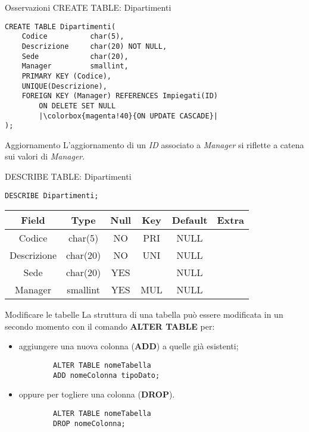 %
\begin{frame}[fragile]{Osservazioni CREATE TABLE: Dipartimenti}
\vspace{-.6cm}
\begin{lstlisting}
CREATE TABLE Dipartimenti(
    Codice          char(5),
    Descrizione     char(20) NOT NULL,
    Sede            char(20),
    Manager         smallint,
    PRIMARY KEY (Codice),
    UNIQUE(Descrizione),
    FOREIGN KEY (Manager) REFERENCES Impiegati(ID)
        ON DELETE SET NULL
        |\colorbox{magenta!40}{ON UPDATE CASCADE}|
);    
\end{lstlisting}
\begin{block}{Aggiornamento}
    L'aggiornamento di un \textit{ID} associato a \textit{Manager} si riflette a catena sui valori di \textit{Manager}.
\end{block}
\end{frame}
%
\begin{frame}[fragile]{DESCRIBE TABLE: Dipartimenti}
\begin{lstlisting}
DESCRIBE Dipartimenti;
\end{lstlisting}
\begin{tabular}{|c|c|c|c|c|c|}
    \hline
    \rowcolor{cyan!30} Field & Type & Null & Key & Default & Extra \\
    \hline
    Codice & char(5) & NO & PRI & NULL & \\ \hline
    Descrizione & char(20) & NO & UNI & NULL & \\ \hline
    Sede & char(20) & YES & & NULL & \\ \hline
    Manager & smallint & YES & MUL & NULL & \\ \hline
\end{tabular}
\end{frame}
\begin{frame}[fragile]{Modificare le tabelle}
La struttura di una tabella pu\`o essere modificata in un secondo momento con il comando \textbf{ALTER TABLE} per:
\begin{itemize}
    \item aggiungere una nuova colonna (\textbf{ADD}) a quelle gi\`a esistenti;
    \begin{lstlisting}
        ALTER TABLE nomeTabella
        ADD nomeColonna tipoDato;
    \end{lstlisting}
    \item oppure per togliere una colonna (\textbf{DROP}).
    \begin{lstlisting}
        ALTER TABLE nomeTabella
        DROP nomeColonna;
    \end{lstlisting}
\end{itemize}
\end{frame}
